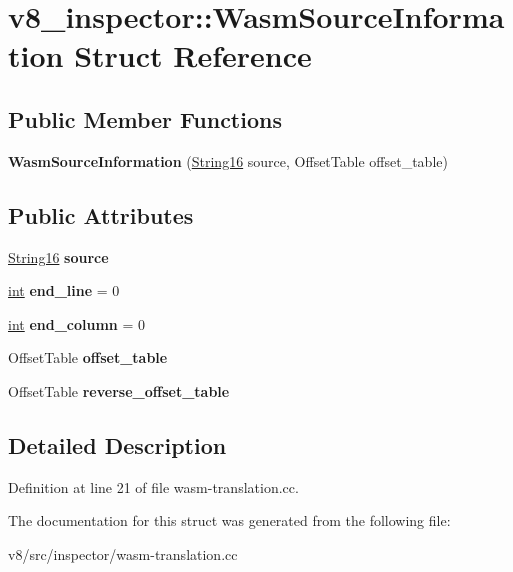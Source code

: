 \hypertarget{structv8__inspector_1_1WasmSourceInformation}{}\section{v8\+\_\+inspector\+:\+:Wasm\+Source\+Information Struct Reference}
\label{structv8__inspector_1_1WasmSourceInformation}
\subsection*{Public Member Functions}
\begin{DoxyCompactItemize}
\item 
\mbox{\label{structv8__inspector_1_1WasmSourceInformation_ad7a455ca0149e4db871b164645549f37}} 
{\bfseries Wasm\+Source\+Information} (\mbox{\hyperlink{classv8__inspector_1_1String16}{String16}} source, Offset\+Table offset\+\_\+table)
\end{DoxyCompactItemize}
\subsection*{Public Attributes}
\begin{DoxyCompactItemize}
\item 
\mbox{\label{structv8__inspector_1_1WasmSourceInformation_a003b99d18af34dc89ba1436593de293e}} 
\mbox{\hyperlink{classv8__inspector_1_1String16}{String16}} {\bfseries source}
\item 
\mbox{\label{structv8__inspector_1_1WasmSourceInformation_a027fa39719318257bced07638dd5484b}} 
\mbox{\hyperlink{classint}{int}} {\bfseries end\+\_\+line} = 0
\item 
\mbox{\label{structv8__inspector_1_1WasmSourceInformation_ae25779aeed11aea72788b1596ccf86d3}} 
\mbox{\hyperlink{classint}{int}} {\bfseries end\+\_\+column} = 0
\item 
\mbox{\label{structv8__inspector_1_1WasmSourceInformation_ad5c21974cdcd4f4f49f009980ac44cee}} 
Offset\+Table {\bfseries offset\+\_\+table}
\item 
\mbox{\label{structv8__inspector_1_1WasmSourceInformation_a3995cdd404976b29822e1d14ef61f1fc}} 
Offset\+Table {\bfseries reverse\+\_\+offset\+\_\+table}
\end{DoxyCompactItemize}


\subsection{Detailed Description}


Definition at line 21 of file wasm-\/translation.\+cc.



The documentation for this struct was generated from the following file\+:\begin{DoxyCompactItemize}
\item 
v8/src/inspector/wasm-\/translation.\+cc\end{DoxyCompactItemize}
